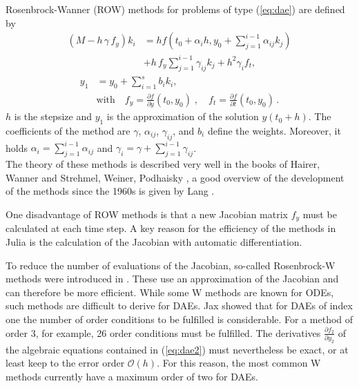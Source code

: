 \documentclass{juliacon}
\begin{document}
Rosenbrock-Wanner (ROW) methods for problems of type (\ref{eq:dae}) are defined by
\begin{align}
(M - h \, \gamma \, f_y) k_i &= h f(t_0+ \alpha_i h, y_0 + \sum_{j=1}^{i-1} \alpha_{ij} k_j) 
\nonumber \\ &
+ h \, f_y \sum_{j=1}^{i-1} \gamma_{ij}  k_j + h^2 \gamma_i f_t , \label{eq_row1} %
\end{align}
\begin{align}
y_1 &= y_0 + \sum_{i=1}^{s} b_i k_i,  \label{eq_row2} \quad \\
& \mbox{with} \quad f_y = \frac{\partial f}{\partial y}(t_0,y_0) \; , \quad f_t = \frac{\partial f}{\partial t}(t_0,y_0) \, . \nonumber
\end{align}
$h$ is the stepsize and $y_1$ is the approximation of the solution $y(t_0+h)$.
The coefficients of the method are $\gamma$, $\alpha_{ij}$, $\gamma_{ij}$, and $b_i$ define the weights. Moreover, it holds $\alpha_i = \sum_{j=1}^{i-1} \alpha_{ij}$ and
$\gamma_i = \gamma + \sum_{j=1}^{i-1} \gamma_{ij}$.\\

The theory of these methods is described very well in the books of Hairer, Wanner \cite{hairer} and Strehmel, Weiner, Podhaisky \cite{strehmel}, 
a good overview of the development of the methods since the 1960s is given by Lang \cite{lang}.

One disadvantage of ROW methods is that a new Jacobian matrix $f_y$ must be calculated at each time step.
A key reason for the efficiency of the methods in Julia is the calculation of the Jacobian with automatic differentiation.

To reduce the number of evaluations of the Jacobian, so-called Rosenbrock-W methods were introduced in \cite{steihaug}. 
These use an approximation of the Jacobian and can therefore be more efficient.
While some W methods are known for ODEs, such methods are difficult to derive for DAEs. Jax \cite{jax2} showed that for DAEs of index one the number of order conditions 
to be fulfilled is considerable. For a method of order 3, for example, 26 order conditions must be fulfilled. 
The derivatives $\frac{\partial f_2}{\partial y_2}$ of the algebraic equations contained in (\ref{eq:dae2}) must nevertheless be exact, or at least keep to the error order 
$\mathcal{O}(h)$. 
For this reason, the most common W methods currently have a maximum order of two for DAEs.
\end{document}
